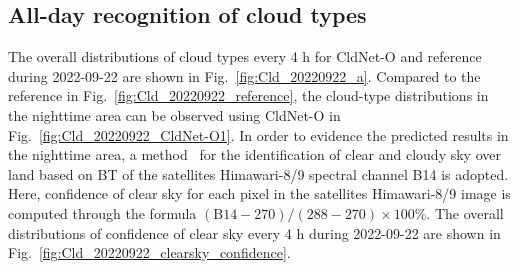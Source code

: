 \documentclass[review]{elsarticle}
\begin{document}
\subsection{All-day recognition of cloud types} %
The overall distributions of cloud types every 4 h for CldNet-O and reference during 2022-09-22 are shown in Fig.~\ref{fig:Cld_20220922_a}.
Compared to the reference in Fig.~\ref{fig:Cld_20220922_reference}, the cloud-type distributions in the nighttime area can be observed using CldNet-O in Fig.~\ref{fig:Cld_20220922_CldNet-O1}.
In order to evidence the predicted results in the nighttime area, a method~\citep{Shang2016JD025659} for the identification of clear and cloudy sky over land based on BT of the satellites Himawari-8/9 spectral channel B14 is adopted.
Here, confidence of clear sky for each pixel in the satellites Himawari-8/9 image is computed through the formula $\mathrm{(B14-270)/(288-270)\times100\%}$.
The overall distributions of confidence of clear sky every 4 h during 2022-09-22 are shown in Fig.~\ref{fig:Cld_20220922_clearsky_confidence}.
\end{document}
